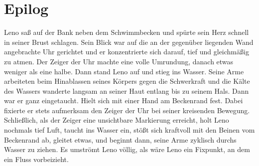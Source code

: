\documentclass[ngerman,smalldemyvopaper,11pt,oneside,onecolumn,openright,extrafontsizes]{memoir}
\begin{document}
\chapter{Epilog}
Leno saß auf der Bank neben dem Schwimmbecken und spürte sein Herz schnell in seiner Brust schlagen. Sein Blick war auf die an der gegenüber liegenden Wand angebrachte Uhr gerichtet und er konzentrierte sich darauf, tief und gleichmäßig zu atmen. Der Zeiger der Uhr machte eine volle Umrundung, danach etwas weniger als eine halbe. Dann stand Leno auf und stieg ins Wasser. Seine Arme arbeiteten beim Hinablassen seines Körpers gegen die Schwerkraft und die Kälte des Wassers wanderte langsam an seiner Haut entlang bis zu seinem Hals. Dann war er ganz eingetaucht. Hielt sich mit einer Hand am Beckenrand fest. Dabei fixierte er stets aufmerksam den Zeiger der Uhr bei seiner kreisenden Bewegung. Schließlich, als der Zeiger eine unsichtbare Markierung erreicht, holt Leno nochmals tief Luft, taucht ins Wasser ein, stößt sich kraftvoll mit den Beinen vom Beckenrand ab, gleitet etwas, und beginnt dann, seine Arme zyklisch durchs Wasser zu ziehen. Es umströmt Leno völlig, als wäre Leno ein Fixpunkt, an dem ein Fluss vorbeizieht.
\end{document}
